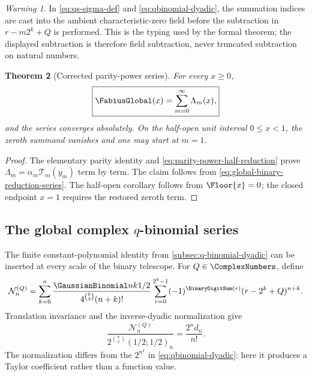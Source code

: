 \documentclass[11pt,oneside]{article}
\newtheorem{theorem}{Theorem}[section]
\theoremstyle{definition}
\theoremstyle{remark}
\newtheorem{warning}[theorem]{Warning}
\begin{document}
\begin{warning}
\label{warn:blu-natural-subtraction}
In \eqref{eq:qs-sigma-def} and \eqref{eq:qbinomial-dyadic}, the summation indices are cast
into the ambient characteristic-zero field before the subtraction in $r-m2^k+Q$ is
performed.  This is the typing used by the formal theorem; the displayed subtraction is
therefore field subtraction, never truncated subtraction on natural numbers.
\end{warning}

\begin{theorem}[Corrected parity-power series]
For every $x\ge0$,
\begin{equation}
 \boxed{\FabiusGlobal(x)=\sum_{m=0}^{\infty}\Lambda_m(x),}  \label{eq:corrected-parity-power-series}
\end{equation}
and the series converges absolutely.  On the half-open unit interval $0\le x<1$, the
zeroth summand vanishes and one may start at $m=1$.
\end{theorem}

\begin{proof}
The elementary parity identity and \eqref{eq:parity-power-half-reduction} prove
$\Lambda_m=\alpha_m\mathcal T_m(y_m)$ term by term.  The claim follows from
\eqref{eq:global-binary-reduction-series}.  The half-open corollary follows from
$\Floor{x}=0$; the closed endpoint $x=1$ requires the restored zeroth term.
\end{proof}

\subsection{The global complex \texorpdfstring{$q$}{q}-binomial series}
\label{subsec:global-q-series}

The finite constant-polynomial identity from \cref{subsec:q-binomial-dyadic} can be inserted
at every scale of the binary telescope.  For $Q\in\ComplexNumbers$, define
\begin{equation}
 \mathcal N_n^{(Q)}=
 \sum_{k=0}^{n}
 \frac{\GaussianBinomial nk{1/2}}{4^{\binom k2}(n+k)!}
 \sum_{r=0}^{2^k-1}(-1)^{\BinaryDigitSum(r)}
 (r-2^k+Q)^{n+k}.                                       \label{eq:q-global-numerator}
\end{equation}
Translation invariance and the inverse-dyadic normalization give
\begin{equation}
 \frac{\mathcal N_n^{(Q)}}
 {2^{\binom n2}(1/2;1/2)_n}
 =\frac{2^n d_n}{n!}.                                    \label{eq:q-taylor-normalization}
\end{equation}
The normalization differs from the $2^{n^2}$ in
\eqref{eq:qbinomial-dyadic}: here it produces a Taylor coefficient rather than a function
value.
\end{document}

